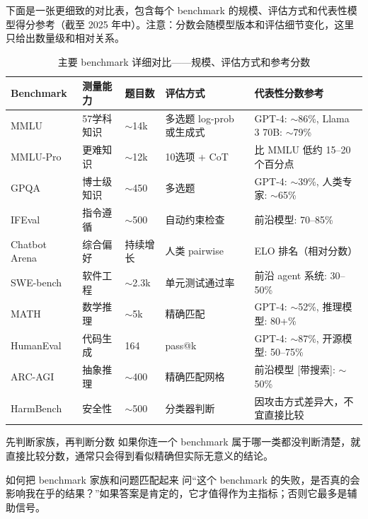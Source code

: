 \documentclass[a4paper]{article}
\begin{document}
下面是一张更细致的对比表，包含每个 benchmark 的规模、评估方式和代表性模型得分参考（截至 2025 年中）。注意：分数会随模型版本和评估细节变化，这里只给出数量级和相对关系。

\begin{table}[H]
\centering
\small
\begin{tabular}{p{2.2cm}p{2.0cm}p{1.5cm}p{2.5cm}p{4.5cm}}
\toprule
\textbf{Benchmark} & \textbf{测量能力} & \textbf{题目数} & \textbf{评估方式} & \textbf{代表性分数参考} \\
\midrule
MMLU & 57学科知识 & $\sim$14k & 多选题 log-prob 或生成式 & GPT-4: $\sim$86\%, Llama 3 70B: $\sim$79\% \\
\midrule
MMLU-Pro & 更难知识 & $\sim$12k & 10选项 + CoT & 比 MMLU 低约 15--20 个百分点 \\
\midrule
GPQA & 博士级知识 & $\sim$450 & 多选题 & GPT-4: $\sim$39\%, 人类专家: $\sim$65\% \\
\midrule
IFEval & 指令遵循 & $\sim$500 & 自动约束检查 & 前沿模型: 70--85\% \\
\midrule
Chatbot Arena & 综合偏好 & 持续增长 & 人类 pairwise & ELO 排名（相对分数） \\
\midrule
SWE-bench & 软件工程 & $\sim$2.3k & 单元测试通过率 & 前沿 agent 系统: 30--50\% \\
\midrule
MATH & 数学推理 & $\sim$5k & 精确匹配 & GPT-4: $\sim$52\%, 推理模型: 80+\% \\
\midrule
HumanEval & 代码生成 & 164 & pass@k & GPT-4: $\sim$87\%, 开源模型: 50--75\% \\
\midrule
ARC-AGI & 抽象推理 & $\sim$400 & 精确匹配网格 & 前沿模型 {[}带搜索{]}: $\sim$50\% \\
\midrule
HarmBench & 安全性 & $\sim$500 & 分类器判断 & 因攻击方式差异大，不宜直接比较 \\
\bottomrule
\end{tabular}
\caption{主要 benchmark 详细对比——规模、评估方式和参考分数}
\end{table}

\begin{importantbox}{先判断家族，再判断分数}
如果你连一个 benchmark 属于哪一类都没判断清楚，就直接比较分数，通常只会得到看似精确但实际无意义的结论。
\end{importantbox}

\begin{knowledgebox}{如何把 benchmark 家族和问题匹配起来}
问“这个 benchmark 的失败，是否真的会影响我在乎的结果？”如果答案是肯定的，它才值得作为主指标；否则它最多是辅助信号。
\end{knowledgebox}
\end{document}
